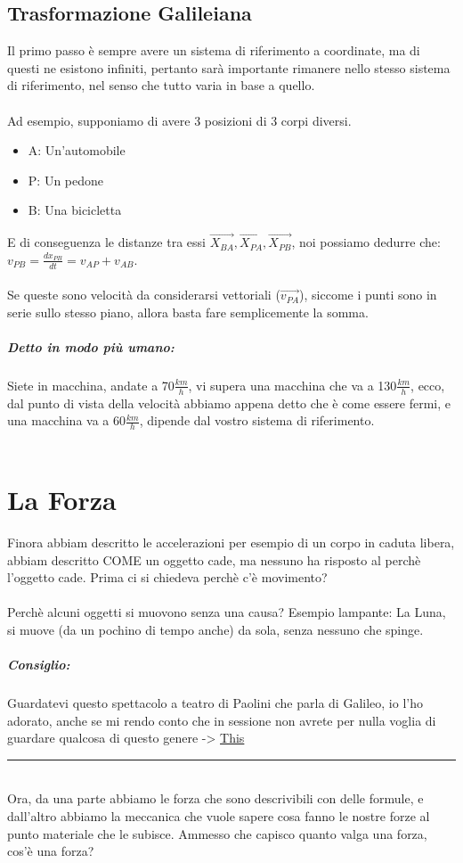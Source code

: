 \documentclass[12pt, a4paper, openany, oneside]{book}
\begin{document}
\section{Trasformazione Galileiana} 
Il primo passo è sempre avere un sistema di riferimento a coordinate, ma di 
questi ne esistono infiniti, pertanto sarà importante rimanere nello stesso 
sistema di riferimento, nel senso che tutto varia in base a quello. \\ \\
Ad esempio, supponiamo di avere 3 posizioni di 3 corpi diversi. 
\begin{itemize}
	\item A: Un'automobile
	\item P: Un pedone
	\item B: Una bicicletta
\end{itemize}
E di conseguenza le distanze tra essi $\overrightarrow{X_{BA}}, 
\overrightarrow{X_{PA}}, \overrightarrow{X_{PB}}$, noi possiamo dedurre che:
$v_{PB} = \frac{dx_{PB}}{dt} = v_{AP} + v_{AB}$. \\ \\
Se queste sono velocità da considerarsi vettoriali ($\overrightarrow{v_{PA}}$), 
siccome i punti sono in serie sullo stesso piano, allora basta fare semplicemente
la somma. 
\paragraph{Detto in modo più umano: } Siete in macchina, andate a 70$\frac{km}{h}$,
vi supera una macchina che va a 130$\frac{km}{h}$, ecco, dal punto di vista
della velocità abbiamo appena detto che è come essere fermi, e una macchina va
a 60$\frac{km}{h}$, dipende dal vostro sistema di riferimento.
\\ \\
\chapter{La Forza}
Finora abbiam descritto le accelerazioni per esempio di un corpo in caduta 
libera, abbiam descritto COME un oggetto cade, ma nessuno ha risposto al perchè
l'oggetto cade. Prima ci si chiedeva perchè c'è movimento? \\ \\
Perchè alcuni oggetti si muovono senza una causa? Esempio lampante: La Luna,
si muove (da un pochino di tempo anche) da sola, senza nessuno che spinge.
\paragraph{Consiglio: } Guardatevi questo spettacolo a teatro di Paolini che 
parla di Galileo, io l'ho adorato, anche se mi rendo conto che in sessione non
avrete per nulla voglia di guardare qualcosa di questo genere ->
\href{https://www.youtube.com/watch?v=8alJ9eFl634}{This}
\\
{\color{black} \rule{\linewidth}{0.3mm} }
\\
Ora, da una parte abbiamo le forza che sono descrivibili con delle formule, 
e dall'altro abbiamo la meccanica che vuole sapere cosa fanno le nostre forze
al punto materiale che le subisce. Ammesso che capisco quanto valga una forza, 
cos'è una forza?
\end{document}
